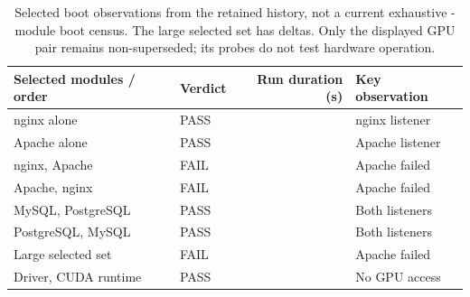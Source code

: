 \begin{table}[tbp]\centering\small
\begin{tabularx}{\textwidth}{@{}Ylrl@{}}
\toprule Selected modules / order & Verdict & Run duration (\si{\second}) & Key observation \\
\midrule
nginx alone & PASS &  & nginx listener \\
Apache alone & PASS &  & Apache listener \\
nginx, Apache & FAIL &  & Apache failed \\
Apache, nginx & FAIL &  & Apache failed \\
MySQL, PostgreSQL & PASS &  & Both listeners \\
PostgreSQL, MySQL & PASS &  & Both listeners \\
Large selected set & FAIL &  & Apache failed \\
Driver, CUDA runtime & PASS &  & No GPU access \\
\bottomrule\end{tabularx}
\caption{Selected boot observations from the retained history, not a current exhaustive -module boot census. The large selected set has  deltas. Only the displayed GPU pair remains non-superseded; its probes do not test hardware operation.}\label{tab:boots}
\end{table}
